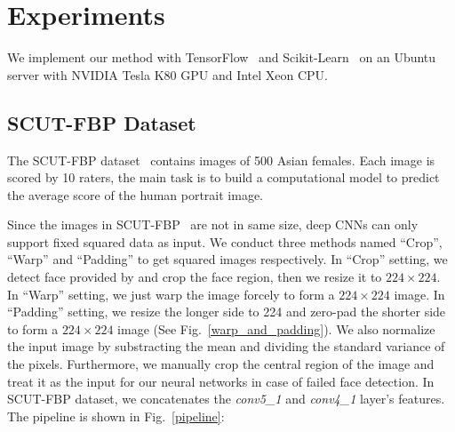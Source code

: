\documentclass[a4paper,conference]{IEEEtran}
\begin{document}
\section{Experiments}
  We implement our method with TensorFlow~\cite{abadi2016tensorflow}
  and Scikit-Learn~\cite{pedregosa2011scikit} on an Ubuntu server with NVIDIA
  Tesla K80 GPU and Intel Xeon CPU.

  \subsection{SCUT-FBP Dataset}
    The SCUT-FBP dataset~\cite{xie2015scut} contains images of 500 Asian females.
    Each image is scored by 10 raters, the main task is to build a computational
    model to predict the average score of the human portrait image.

    Since the images in SCUT-FBP~\cite{xie2015scut} are not in same size,
    deep CNNs can only support fixed squared data as input. We conduct three
    methods named ``Crop'', ``Warp'' and ``Padding'' to get squared images
    respectively.
    In ``Crop'' setting, we detect face provided by \cite{King2009Dlib}
    and crop the face region, then we resize it to $224\times224$.
    In ``Warp'' setting, we just warp the image forcely to form a
    $224\times224$ image.
    In ``Padding'' setting, we resize the longer side
    to 224 and zero-pad the shorter side to form a $224\times224$ image
    (See Fig.~\ref{warp_and_padding}). We also normalize the input image
    by substracting the mean and dividing the standard variance of the pixels.
    Furthermore, we manually crop the central region of the image and treat it
    as the input for our neural networks in case of failed face detection.
    In SCUT-FBP dataset, we concatenates the \emph{conv5\_1} and \emph{conv4\_1}
    layer's features. The pipeline is shown in Fig.~\ref{pipeline}:
\end{document}
